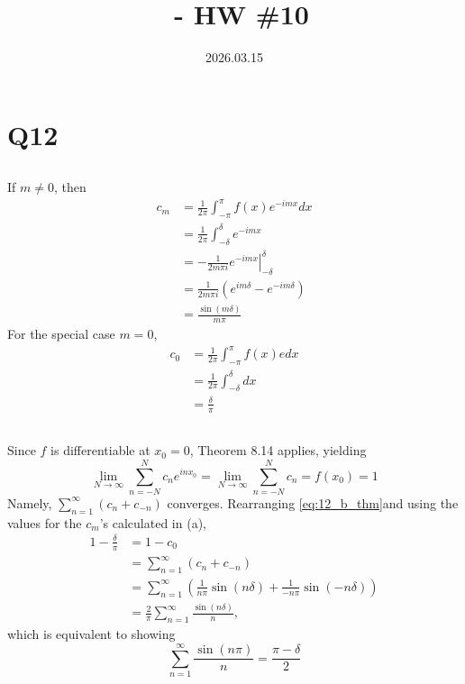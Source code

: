 \documentclass[12pt]{article}
\title{\course\ - HW \#10}
\author{\myname}
\date{2026.03.15}
\begin{document}
\maketitle
\thispagestyle{fancy}


\section*{Q12} 
\subsection{}
If $m \neq 0$, then 
\begin{align*}
  c_m & = \frac{1}{2\pi} \int_{-\pi}^{\pi} f(x) e^{-imx} dx \\ 
      & = \frac{1}{2\pi} \int_{-\delta}^{\delta} e^{-imx} \\ 
      & = -\frac{1}{2m\pi i} \left.e^{-imx}\right|_{-\delta}^{\delta} \\ 
      & = \frac{1}{2m\pi i} (e^{im\delta} - e^{-im\delta}) \\ 
      & = \frac{\sin(m\delta)}{m\pi}
\end{align*}
For the special case $m = 0$, 
\begin{align*}
  c_0 & = \frac{1}{2\pi} \int_{-\pi}^{\pi} f(x) e dx \\ 
      & = \frac{1}{2\pi} \int_{-\delta}^{\delta} dx \\ 
      & = \frac{\delta}{\pi}
\end{align*}

\subsection{}
Since $f$ is differentiable at $x_0 = 0$, Theorem 8.14 applies, yielding 
\begin{equation} \label{eq:12_b_thm}
  \lim_{N \rightarrow \infty} \sum_{n = -N}^{N} c_n e^{in x_0} = \lim_{N \rightarrow \infty} \sum_{n = -N}^{N} c_n = f(x_0) = 1
\end{equation}
Namely, $\sum_{n = 1}^{\infty} (c_n + c_{-n})$ converges. 
Rearranging \eqref{eq:12_b_thm}and using the values for the $c_m$'s calculated in (a), 
\begin{align*} 
  1 - \frac{\delta}{\pi} & = 1 - c_0 \\ 
                         & = \sum_{n = 1}^{\infty} (c_n + c_{-n}) \\ 
                         & = \sum_{n = 1}^{\infty} (\frac{1}{n\pi} \sin(n\delta) + \frac{1}{-n\pi} \sin(-n\delta)) \\ 
                         & = \frac{2}{\pi} \sum_{n = 1}^{\infty} \frac{\sin(n\delta)}{n},
\end{align*}
which is equivalent to showing 
$$\sum_{n = 1}^{\infty} \frac{\sin(n\pi)}{n} = \frac{\pi - \delta}{2}$$
\end{document}
